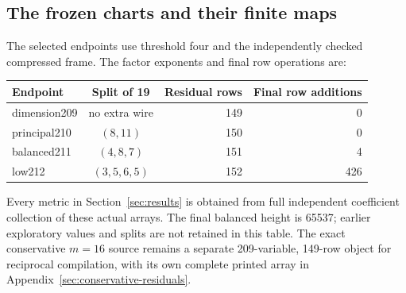\subsection{The frozen charts and their finite maps}
The selected endpoints use threshold four and the independently checked
compressed frame. The factor exponents and final row operations are:
\begin{center}\small
\begin{tabular}{@{}lcrr@{}}\toprule
Endpoint & Split of 19 & Residual rows & Final row additions\\\midrule
dimension209 & no extra wire &149&0\\
principal210 &$(8,11)$&150&0\\
balanced211 &$(4,8,7)$&151&4\\
low212 &$(3,5,6,5)$&152&426\\\bottomrule
\end{tabular}
\end{center}
Every metric in Section~\ref{sec:results} is obtained from full independent
coefficient collection of these actual arrays. The final balanced height
is 65537; earlier exploratory values and splits are not retained in this
table. The exact conservative $m=16$ source remains a separate 209-variable,
149-row object for reciprocal compilation, with its own complete printed
array in Appendix~\ref{sec:conservative-residuals}.
